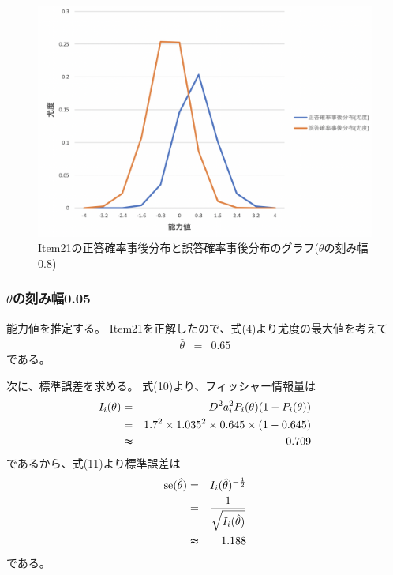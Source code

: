 \documentclass[12pt]{jarticle}
\begin{document}
\clearpage
\begin{figure}[h]
    \begin{center}
        \includegraphics[scale=0.3]{kadai5_2_7.png}
    \end{center}
    \caption{Item21の正答確率事後分布と誤答確率事後分布のグラフ($\theta$の刻み幅0.8)}
\end{figure}

\subsubsection*{$\theta$の刻み幅0.05}
能力値を推定する。
Item21を正解したので、式(4)より尤度の最大値を考えて
\begin{eqnarray}
    \hat{\theta}&=&0.65 \nonumber
\end{eqnarray}
である。

次に、標準誤差を求める。
式(10)より、フィッシャー情報量は
\begin{eqnarray}
    I_i(\theta)&=&D^2a_i^2 P_i(\theta)(1-P_i(\theta)) \nonumber\\
    &=&1.7^2 \times 1.035^2\times 0.645\times (1-0.645) \nonumber\\
    &\thickapprox& 0.709 \nonumber
\end{eqnarray}
であるから、式(11)より標準誤差は
\begin{eqnarray}
    {\rm se}(\hat{\theta})&=&I_i(\hat{\theta})^{-\frac{1}{2}} \nonumber\\
    &=&\frac{1}{\sqrt{I_i(\hat{\theta})}}\nonumber\\
    &\thickapprox&1.188\nonumber
\end{eqnarray}
である。

\clearpage
\end{document}
